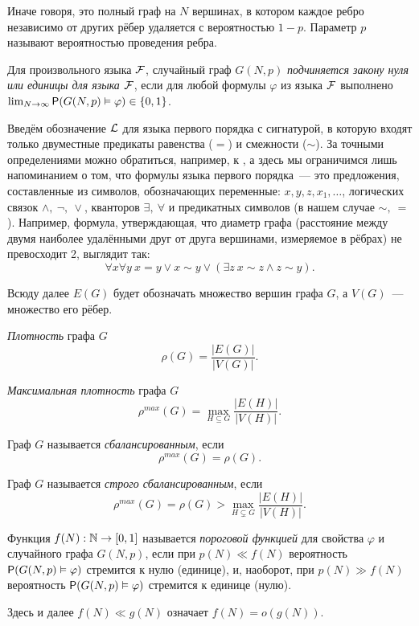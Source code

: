   Иначе говоря, это полный граф на $N$ вершинах, в котором каждое ребро независимо от других рёбер удаляется с вероятностью $1-p$.
  Параметр $p$ называют вероятностью проведения ребра.
    
    \Def Для произвольного языка $\F$, случайный граф $G(N, p)$ \textit{подчиняется закону нуля или единицы для языка $\F$},
    если для любой формулы $\varphi$ из языка 
    $\F$  выполнено
    $\lim_{N \rightarrow \infty} \P(G(N, p) \vDash \varphi) \in \{0, 1\}$.
    
    Введём обозначение $\LL$ для языка первого порядка с сигнатурой, в которую входят только двуместные предикаты равенства ($=$) и смежности ($\sim$).
    За точными определениями можно обратиться, например, к
    \cite{shen}, а здесь мы ограничимся лишь напоминанием о том, что формулы языка первого порядка~--- это предложения, составленные из символов, обозначающих переменные: 
    $x,y,z,x_1,\ldots$, 
    логических связок 
    $\wedge, ~\neg, ~\vee$, 
    кванторов 
    $\exists, ~\forall$ и 
    предикатных символов (в нашем случае
    $\sim, ~ =$).
    Например, формула, утверждающая, что диаметр графа (расстояние между двумя наиболее удалёнными друг от друга вершинами, измеряемое в рёбрах) не превосходит 2, выглядит так:
    \[
    \forall x \forall y ~ x=y \vee x\sim y \vee \left( \exists z ~ x \sim z \wedge z \sim y \right).
    \]
    
    Всюду далее $E(G)$ будет обозначать множество вершин графа $G$, а $V(G)$~--- множество его рёбер.
    
    \Def \textit{Плотность} графа $G$ 
   \[ \rho(G) = \frac {|E(G)|}{|V(G)|} .\]
   
   \Def \textit{Максимальная плотность} графа $G$
     \[ \rho^{max}(G) = \max_{H \subseteq G} \frac {|E(H)|}{|V(H)|} .\]
    
    \Def Граф $G$ называется \textit{сбалансированным}, если 
    \[ \rho^{max}(G) = \rho(G) .\]
    
    \Def Граф $G$ называется \textit{строго сбалансированным}, если 
    \[\rho^{max}(G) = \rho(G) > \max_{H \subsetneq G} \frac {|E(H)|}{|V(H)|} .\]
    
    \Def Функция $f(N): \N \rightarrow [0,1]$ называется \textit{пороговой функцией} для свойства $\varphi$ и случайного графа $G(N,p)$, если при $p(N) \ll f(N)$ вероятность $\P(G(N,p) \vDash \varphi)$ стремится к нулю (единице), и, наоборот, при $p(N) \gg f(N)$ вероятность $\P(G(N,p) \vDash \varphi)$ стремится к единице (нулю).
    
    Здесь и далее $f(N) \ll g(N)$ означает $f(N) = o(g(N))$.
     
